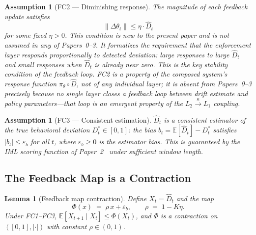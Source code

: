 \documentclass[11pt]{article}
\newtheorem{lemma}[theorem]{Lemma}
\newtheorem{assumption}[theorem]{Assumption}
\newcommand{\Dhat}{\widehat{D}}
\newcommand{\Layer}[1]{L_{#1}}
\begin{document}
\begin{assumption}[FC2 --- Diminishing response]
\label{ass:fc2}
The magnitude of each feedback update satisfies
\[
  \|\Delta\theta_t\| \le \eta \cdot \Dhat_t
\]
for some fixed $\eta > 0$. This condition is new to the present paper and is
not assumed in any of Papers~0--3. It formalizes the requirement that the
enforcement layer responds proportionally to detected deviation: large
responses to large $\Dhat_t$ and small responses when $\Dhat_t$ is already
near zero. This is the key \emph{stability condition} of the feedback loop.
FC2 is a property of the \emph{composed} system's response function
$\pi_\theta \circ \Dhat$, not of any individual layer; it is absent from
Papers~0--3 precisely because no single layer closes a feedback loop between
drift estimate and policy parameters---that loop is an emergent property of
the $\Layer{2} \xrightarrow{\kappa} \Layer{1}$ coupling.
\end{assumption}

\begin{assumption}[FC3 --- Consistent estimation]
\label{ass:fc3}
$\Dhat_t$ is a consistent estimator of the true behavioral deviation
$D_t^* \in [0,1]$: the bias $b_t = \mathbb{E}[\Dhat_t] - D_t^*$ satisfies
$|b_t| \le \varepsilon_b$ for all $t$, where $\varepsilon_b \ge 0$ is the
estimator bias. This is guaranteed by the IML scoring function of
Paper~2~\cite{fernandez2026c} under sufficient window length.
\end{assumption}

\subsection{The Feedback Map is a Contraction}

\begin{lemma}[Feedback map contraction]
\label{lem:contraction}
Define $X_t = \Dhat_t$ and the map
\[
  \Phi(x) \;=\; \rho\, x + \varepsilon_b, \qquad \rho \;=\; 1 - K\eta.
\]
Under FC1--FC3, $\mathbb{E}[X_{t+1} \mid X_t] \le \Phi(X_t)$, and $\Phi$
is a contraction on $([0,1], |\cdot|)$ with constant $\rho \in (0,1)$.
\end{lemma}
\end{document}
